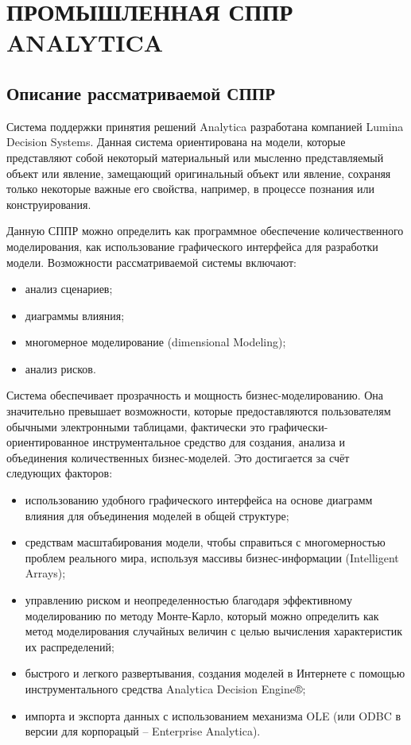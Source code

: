 \section[Промышленная СППР Analytica]
{ПРОМЫШЛЕННАЯ СППР ANALYTICA}

\subsection{Описание рассматриваемой СППР}

Система поддержки принятия решений Analytica разработана компанией Lumina Decision Systems.
Данная система ориентирована на модели, которые представляют собой некоторый
материальный или мысленно представляемый объект или явление, замещающий
оригинальный объект или явление, сохраняя только некоторые важные его свойства,
например, в процессе познания или конструирования.

Данную СППР можно определить как программное обеспечение количественного моделирования,
как использование графического интерфейса для разработки модели.
Возможности рассматриваемой системы включают:
\begin{itemize}
  \item анализ сценариев;
  \item диаграммы влияния;
  \item многомерное моделирование (dimensional Modeling);
  \item анализ рисков.
\end{itemize}

Система обеспечивает прозрачность и мощность бизнес-моделированию. Она значительно
превышает возможности, которые предоставляются пользователям обычными электронными
таблицами, фактически это графически-ориентированное инструментальное средство
для создания, анализа и объединения количественных бизнес-моделей. Это достигается
за счёт следующих факторов:

\begin{itemize}
  \item использованию удобного графического интерфейса на основе диаграмм влияния
    для объединения моделей в общей структуре;
  \item средствам масштабирования модели, чтобы справиться с многомерностью проблем
    реального мира, используя массивы бизнес-информации (Intelligent Arrays);
  \item управлению риском и неопределенностью благодаря эффективному моделированию
    по методу Монте-Карло, который можно определить как метод моделирования
    случайных величин с целью вычисления характеристик их распределений;
  \item быстрого и легкого развертывания, создания моделей в Интернете с помощью
    инструментального средства Analytica Decision Engine®;
  \item импорта и экспорта данных с использованием механизма OLE (или
    ODBC в версии для корпорацый – Enterprise Analytica).
\end{itemize}

